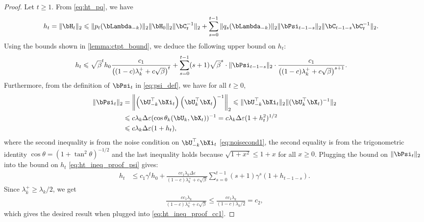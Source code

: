 \documentclass{article}
\theoremstyle{plain}
\theoremstyle{definition}
\theoremstyle{remark}
\begin{document}
\begin{proof}
  Let $t\geqslant 1$. From \eqref{eq:ht_pq}, we have
  \begin{align*}
    h_t & = \Vert \bH_t \Vert_2 \leqslant \Vert p_t(\bLambda_{-k}) \Vert_2 \Vert \bH_0 \Vert_2 \Vert \bC_t^{-1} \Vert_2 + \sum_{s=0}^{t-1} \Vert q_s(\bLambda_{-k}) \Vert_2 \Vert \bPsi_{t-1-s} \Vert_2 \Vert \bC_{t-1-s} \bC_t^{-1} \Vert_2.
  \end{align*}
  Using the bounds shown in \cref{lemma:ctpt_bound}, we deduce the following upper bound on $h_t$:
  \begin{align}\label{eq:ht_ineq_proof_psi}
    h_t & \leqslant \sqrt{\beta}^t h_0 \frac{c_1}{\left((1-c)\lambda_k^+ + c\sqrt{\beta}\right)^t} + \sum_{s=0}^{t-1} (s+1) \sqrt{\beta}^s \cdot \Vert \bPsi_{t-1-s} \Vert_2  \cdot \frac{c_1}{\left((1-c)\lambda_k^+ + c\sqrt{\beta}\right)^{s+1}}.
  \end{align}
  Furthermore, from the definition of $\bPsi_t$ in \eqref{eq:psi_def}, we have for all $t\geqslant 0$,
  \begin{align*}
    \Vert \bPsi_t \Vert_2 & = \left\Vert \left(\bU_{-k}^\top \bXi_t\right) \left(\bU_k^\top \bX_t\right)^{-1} \right\Vert_2 \leqslant \Vert \bU_{-k}^\top \bXi_t \Vert_2 \Vert (\bU_k^\top \bX_t)^{-1} \Vert_2 \\
    & \leqslant c\lambda_k\Delta\varepsilon (\cos \theta_k(\bU_k, \bX_t))^{-1}  = c\lambda_k\Delta\varepsilon (1 + h_t^2)^{1/2} \\
    & \leqslant c\lambda_k\Delta\varepsilon (1 + h_t),
  \end{align*}
  where the second inequality is from the noise condition on $\bU_{-k}^\top\bXi_t$ \eqref{eq:noisecond1}, the second equality is from the trigonometric identity $\cos \theta = (1 + \tan^2 \theta)^{-1/2}$ and the last inequality holds because $\sqrt{1+x^2} \leqslant 1 + x$ for all $x\geqslant 0$. Plugging the bound on $\Vert\bPsi_t\Vert_2$ into the bound on $h_t$ \eqref{eq:ht_ineq_proof_psi} gives:
  \begin{align}\label{eq:ht_ineq_proof_cc1}
    h_t & \leqslant c_1 \gamma^t h_0 + \frac{c c_1 \lambda_k \Delta\varepsilon}{(1-c)\lambda_k^+ + c\sqrt{\beta}} \sum_{s=0}^{t-1} (s+1) \gamma^s (1 + h_{t-1-s}).
  \end{align}
  Since $\lambda_k^+ \geqslant \lambda_k/2$, we get
  \begin{align*}
    \frac{c c_1 \lambda_k}{(1-c)\lambda_k^+ + c\sqrt{\beta}} \leqslant \frac{c c_1 \lambda_k}{(1-c)\lambda_k/2} = c_2,
  \end{align*}
  which gives the desired result when plugged into \eqref{eq:ht_ineq_proof_cc1}.
\end{proof}
\end{document}
